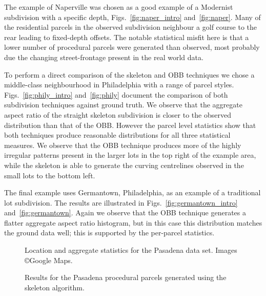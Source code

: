 The example of Naperville was chosen as a good example of a Modernist subdivision with a specific depth, Figs.~\ref{fig:naper_intro} and~\ref{fig:naper}. Many of the residential parcels in the observed subdivision neighbour a golf course to the rear leading to fixed-depth offsets. The notable statistical misfit here is that a lower number of procedural parcels were generated than observed, most probably due the changing street-frontage present in the real world data.


To perform a direct comparison of the skeleton and OBB techniques we chose a middle-class neighbourhood in Philadelphia with a range of parcel styles. Figs.~\ref{fig:phily_intro} and~\ref{fig:phily} document the comparison of both subdivision techniques against ground truth. We observe that the aggregate aspect ratio of the straight skeleton subdivision is closer to the observed distribution than that of the OBB. However the parcel level statistics show that both techniques produce reasonable distributions for all three statistical measures. We observe that the OBB technique produces more of the highly irregular patterns present in the larger lots in the top right of the example area, while the skeleton is able to generate the curving centrelines observed in the small lots to the bottom left.


The final example uses Germantown, Philadelphia, as an example of a traditional lot subdivision. The results are illustrated in Figs.~\ref{fig:germantown_intro} and~\ref{fig:germantown}. Again we observe that the OBB technique generates a flatter aggregate aspect ratio histogram, but in this case this distribution matches the ground data well; this is supported by the per-parcel statistics.

\FloatBarrier



\begin{figure}
\centering
\def\svgwidth{1.\columnwidth}

\caption[Pasadena data set]{\label{fig:pasadena_intro}Location and aggregate statistics for the Pasadena data set. Images \copyright Google Maps.}
\end{figure}

\begin{figure}
\centering
\def\svgwidth{1.\columnwidth}

\caption[Pasadena results]{\label{fig:pasadena}Results for the Pasadena procedural parcels generated using the skeleton algorithm.}
\end{figure}

